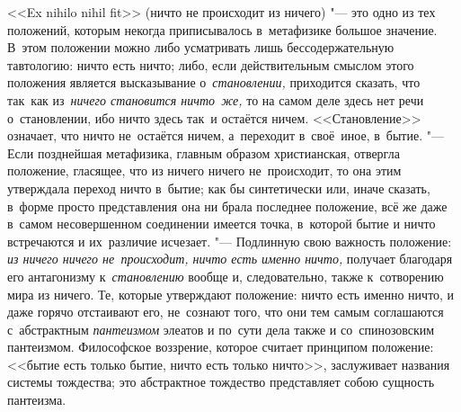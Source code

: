 <<Ex nihilo nihil fit>> (ничто не происходит из ничего) "--- это одно из тех
положений, которым некогда приписывалось в~метафизике большое значение. В~этом
положении можно либо усматривать лишь бессодержательную тавтологию: ничто есть
ничто; либо, если действительным смыслом этого положения является высказывание
о~{\em становлении,} приходится сказать, что так~как из~{\em ничего становится
ничто~же,} то на самом деле здесь нет речи о~становлении, ибо ничто здесь так~и
остаётся ничем. <<Становление>> означает, что ничто не~остаётся ничем,
а~переходит в~своё~иное, в~бытие. "--- Если позднейшая метафизика, главным
образом христианская, отвергла положение, гласящее, что из ничего ничего
не~происходит, то она этим утверждала переход ничто в~бытие; как бы
синтетически или, иначе сказать, в~форме просто представления она ни брала
последнее положение, всё же даже в~самом несовершенном соединении имеется
точка, в~которой бытие и ничто встречаются и их~различие исчезает. "---
Подлинную свою важность положение: {\em из ничего ничего не~происходит, ничто
есть именно ничто,} получает благодаря его антагонизму к~{\em становлению}
вообще и, следовательно, также к~сотворению мира из ничего. Те, которые
утверждают положение: ничто есть именно ничто, и даже горячо отстаивают его,
не~сознают того, что они тем самым соглашаются с~абстрактным {\em пантеизмом}
элеатов и по~сути дела также и со~спинозовским пантеизмом. Философское
воззрение, которое считает принципом положение: <<бытие есть только бытие,
ничто есть только ничто>>, заслуживает названия системы тождества; это
абстрактное тождество представляет собою сущность пантеизма.

